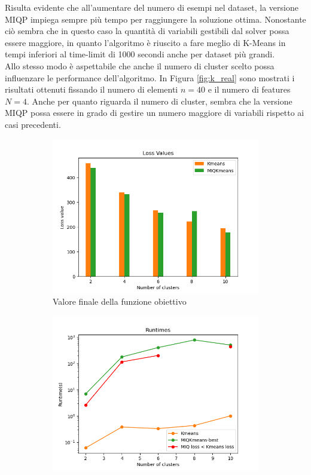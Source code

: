 \documentclass{article}
\begin{document}
    Risulta evidente che all'aumentare del numero di esempi nel dataset, la versione MIQP impiega sempre più tempo per raggiungere la soluzione ottima. Nonostante ciò sembra che in questo caso la quantità di variabili gestibili dal solver possa essere maggiore, in quanto l'algoritmo è riuscito a fare meglio di K-Means in tempi inferiori al time-limit di 1000 secondi anche per dataset più grandi.\\
    Allo stesso modo è aspettabile che anche il numero di cluster scelto possa influenzare le performance dell'algoritmo. In Figura \ref{fig:k_real} sono mostrati i risultati ottenuti fissando il numero di elementi $n=40$ e il numero di features $N=4$. Anche per quanto riguarda il numero di cluster, sembra che la versione MIQP possa essere in grado di gestire un numero maggiore di variabili rispetto ai casi precedenti.
    \begin{figure}[H]
     \centering
     \begin{subfigure}[t]{0.485\linewidth}
         \centering
         \includegraphics[width=\linewidth]{../results/log_plots/loss_centers_heart}
         \caption{Valore finale della funzione obiettivo}
     \end{subfigure}
     \hfill
     \begin{subfigure}[t]{0.49\linewidth}
         \centering
         \includegraphics[width=\linewidth]{../results/log_plots/runtime_centers_heart_log}

\end{subfigure}
\end{figure}
\end{document}
